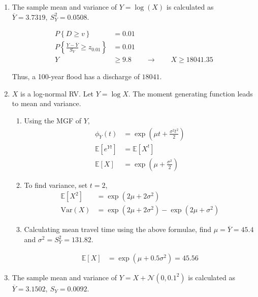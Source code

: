 \begin{enumerate}
	
	\item The sample mean and variance of $ Y = \log(X) $ is calculated as $ \overline{Y} = 3.7319,\ S_Y^2 = 0.0508 $.
	
	
		\begin{align}
			P \left\{ D \geq v \right\} &= 0.01 \nonumber \\
			P \left\{ \frac{Y - \overline{Y}}{S_Y} \geq z_{0.01}\right\} &= 0.01 \nonumber \\
			Y &\geq 9.8 \qquad \to \qquad X \geq 18041.35	
		\end{align}
	
	
	Thus, a 100-year flood has a discharge of $ 18041 $.
	
	\item $ X $ is a log-normal RV. Let $ Y = \log X $. The moment generating function leads to mean and variance.
	
		\begin{enumerate}
			\item Using the MGF of $ Y $,
			\begin{align}
				\phi_Y(t) &= \exp \left( \mu t  + \frac{\sigma^2 t^2}{2}\right) \nonumber \\
				\mathbb{E}[e^{Yt}] &= \mathbb{E}[X^t] \nonumber \\
				\mathbb{E}[X] &= \exp \left(\mu + \frac{\sigma^2}{2}\right)
			\end{align}
			
			\item To find variance, set $ t = 2 $,
			\begin{align}
				\mathbb{E}[X^2] &= \exp \left(2\mu + 2\sigma^2\right) \nonumber \\
				\mathrm{Var}(X) &= \exp \left(2\mu + 2\sigma^2\right) - \exp \left(2\mu + \sigma^2\right)
			\end{align}
			
			\item Calculating mean travel time using the above formulae,
			find $\mu =  \overline{Y} = 45.4 $ and $ \sigma^2 = S_Y^2 = 131.82 $.
			
			\begin{align}
				\mathbb{E}[X] &= \exp \left(\mu + 0.5\sigma^2\right) = 45.56
			\end{align}
			
		\end{enumerate}
	
	
	\item The sample mean and variance of $ Y = X + \mathcal{N} (0, 0.1^2) $ is calculated as
	$ \overline{Y} = 3.1502,\ S_Y = 0.0092 $.
	

\end{enumerate}
